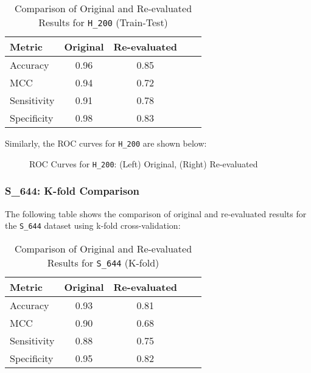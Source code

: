       \begin{table}[h]
        \centering
        \caption{Comparison of Original and Re-evaluated Results for \texttt{H\_200} (Train-Test)}
        \begin{tabular}{lcccc}
          \hline
          \textbf{Metric} & \textbf{Original} & \textbf{Re-evaluated} \\
          \hline
          Accuracy        & 0.96              & 0.85                  \\
          MCC             & 0.94              & 0.72                  \\
          Sensitivity     & 0.91              & 0.78                  \\
          Specificity     & 0.98              & 0.83                  \\
          \hline
        \end{tabular}
      \end{table}

      Similarly, the ROC curves for \texttt{H\_200} are shown below:

      \begin{figure}[h]
        \centering
        \caption{ROC Curves for \texttt{H\_200}: (Left) Original, (Right) Re-evaluated}
      \end{figure}

    \subsubsection{S\_644: K-fold Comparison}

      The following table shows the comparison of original and re-evaluated results for the \texttt{S\_644} dataset using k-fold cross-validation:

      \begin{table}[h]
        \centering
        \caption{Comparison of Original and Re-evaluated Results for \texttt{S\_644} (K-fold)}
        \begin{tabular}{lcccc}
          \hline
          \textbf{Metric} & \textbf{Original} & \textbf{Re-evaluated} \\
          \hline
          Accuracy        & 0.93              & 0.81                  \\
          MCC             & 0.90              & 0.68                  \\
          Sensitivity     & 0.88              & 0.75                  \\
          Specificity     & 0.95              & 0.82                  \\
          \hline
        \end{tabular}
      \end{table}

